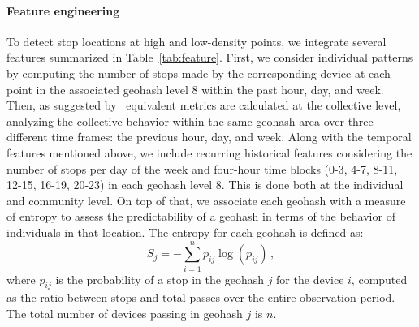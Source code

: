 \documentclass{article}
\begin{document}
\paragraph{Feature engineering}
To detect stop locations at high and low-density points, we integrate several features summarized in Table~\ref{tab:feature}. 
First, we consider individual patterns by computing the number of stops made by the corresponding device at each point in the associated geohash level 8 within the past hour, day, and week.
Then, as suggested by~\citep{Bontorin2024a} equivalent metrics are calculated at the collective level, analyzing the collective behavior within the same geohash area over three different time frames: the previous hour, day, and week.
Along with the temporal features mentioned above, we include recurring historical features considering the number of stops per day of the week and four-hour time blocks (0-3, 4-7, 8-11, 12-15, 16-19, 20-23) in each geohash level 8. This is done both at the individual and community level.
On top of that, we associate each geohash with a measure of entropy to assess the predictability of a geohash in terms of the behavior of individuals in that location. The entropy for each geohash is defined as:
\begin{equation}
    \label{eq:entropy}
    S_{j} = -\sum_{i=1}^n p_{ij} \log \left(p_{ij}\right)\,,
\end{equation}
where $p_{ij}$ is the probability of a stop in the geohash $j$ for the device $i$, computed as the ratio between stops and total passes over the entire observation period. The total number of devices passing in geohash $j$ is $n$.
\end{document}
